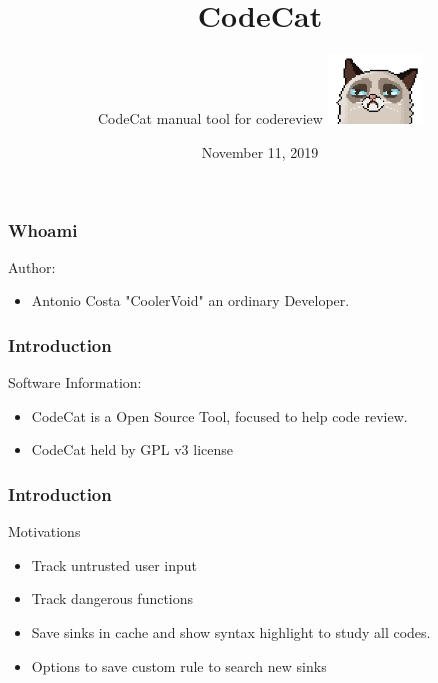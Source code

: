 \documentclass[serif,mathserif]{beamer}
\author[CodeCat v0.1]{ CodeCat manual tool for codereview \quad \includegraphics[width=2.5cm]{images/codecat00.png} }
\title[ Page \hspace{2em}\insertframenumber/\inserttotalframenumber]{CodeCat}
\date{November 11, 2019}
\institute{Antonio Costa - CoolerVoid - coolerlair[aT]gmail[DOt]com}
\begin{document}
\maketitle



\begin{frame}
  \frametitle{Whoami}
  Author:
  \begin{itemize}  \item Antonio Costa "CoolerVoid" an ordinary Developer.
  \end{itemize}
  \begin{figure}[t]
    \centering
  \end{figure}
\end{frame}


\begin{frame}
  \frametitle{Introduction}
  Software Information:
  \begin{itemize}
  \item  CodeCat is a Open Source Tool, focused to help code review. 
  \item  CodeCat held by GPL v3 license
  \end{itemize}
\end{frame}



\begin{frame}
  \frametitle{Introduction}
  Motivations
  \begin{itemize}
  \item  Track untrusted user input 
  \item  Track dangerous functions
  \item  Save sinks in cache and show syntax highlight to study all codes.
  \item  Options to save custom rule to search new sinks	  
  \end{itemize}
\end{frame}
\end{document}
